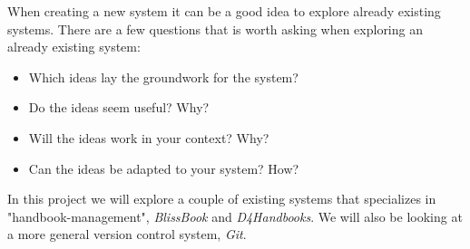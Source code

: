 When creating a new system it can be a good idea to explore already existing systems. There are a few questions that is worth asking when exploring an already existing system:

\begin{itemize}
  \item Which ideas lay the groundwork for the system?
  \item Do the ideas seem useful? Why?
  \item Will the ideas work in your context? Why?
  \item Can the ideas be adapted to your system? How?
\end{itemize}


In this project we will explore a couple of existing systems that specializes in "handbook-management", \textit{BlissBook} and \textit{D4Handbooks}. We will also be looking at a more general version control system, \textit{Git}.
